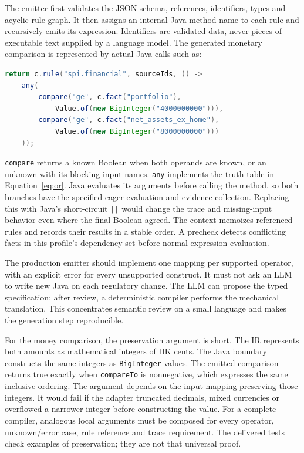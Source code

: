 The emitter first validates the JSON schema, references, identifiers, types and
acyclic rule graph. It then assigns an internal Java method name to each rule
and recursively emits its expression. Identifiers are validated data, never
pieces of executable text supplied by a language model. The generated monetary
comparison is represented by actual Java calls such as:
\begin{lstlisting}[language=Java,caption={The generated financial method's essential body. The complete class is built and tested in the supplied example.}]
return c.rule("spi.financial", sourceIds, () ->
    any(
        compare("ge", c.fact("portfolio"),
            Value.of(new BigInteger("4000000000"))),
        compare("ge", c.fact("net_assets_ex_home"),
            Value.of(new BigInteger("8000000000")))
    ));
\end{lstlisting}
\texttt{compare} returns a known Boolean when both operands are known, or an
unknown with its blocking input names. \texttt{any} implements the truth table
in Equation~\eqref{eq:or}. Java evaluates its arguments before calling the
method, so both branches have the specified eager evaluation and evidence
collection. Replacing this with Java's short-circuit \texttt{||} would change
the trace and missing-input behavior even where the final Boolean agreed.
The context memoizes referenced rules and records their results in a stable
order. A precheck detects conflicting facts in this profile's dependency set
before normal expression evaluation.

The production emitter should implement one mapping per supported operator,
with an explicit error for every unsupported construct. It must not ask an LLM
to write new Java on each regulatory change. The LLM can propose the typed
specification; after review, a deterministic compiler performs the mechanical
translation. This concentrates semantic review on a small language and makes
the generation step reproducible.

For the money comparison, the preservation argument is short. The IR represents
both amounts as mathematical integers of HK cents. The Java boundary constructs
the same integers as \texttt{BigInteger} values. The emitted comparison returns
true exactly when \texttt{compareTo} is nonnegative, which expresses the same
inclusive ordering. The argument depends on the input mapping preserving those
integers. It would fail if the adapter truncated decimals, mixed currencies or
overflowed a narrower integer before constructing the value. For a complete
compiler, analogous local arguments must be composed for every operator,
unknown/error case, rule reference and trace requirement. The delivered tests
check examples of preservation; they are not that universal proof.

